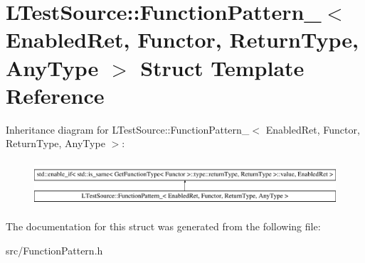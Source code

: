 \hypertarget{struct_l_test_source_1_1_function_pattern___3_01_enabled_ret_00_01_functor_00_01_return_type_00_01_any_type_01_4}{\section{L\-Test\-Source\-:\-:Function\-Pattern\-\_\-$<$ Enabled\-Ret, Functor, Return\-Type, Any\-Type $>$ Struct Template Reference}
\label{struct_l_test_source_1_1_function_pattern___3_01_enabled_ret_00_01_functor_00_01_return_type_00_01_any_type_01_4}
}
Inheritance diagram for L\-Test\-Source\-:\-:Function\-Pattern\-\_\-$<$ Enabled\-Ret, Functor, Return\-Type, Any\-Type $>$\-:\begin{figure}[H]
\begin{center}
\leavevmode
\includegraphics[height=1.709924cm]{struct_l_test_source_1_1_function_pattern___3_01_enabled_ret_00_01_functor_00_01_return_type_00_01_any_type_01_4}
\end{center}
\end{figure}


The documentation for this struct was generated from the following file\-:\begin{DoxyCompactItemize}
\item 
src/Function\-Pattern.\-h\end{DoxyCompactItemize}
